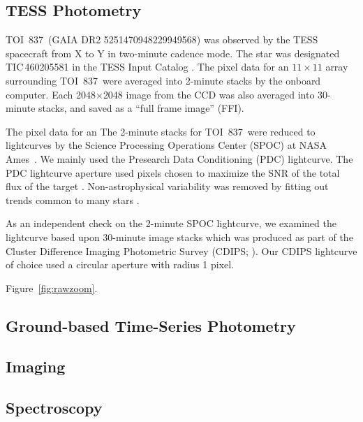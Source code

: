 \documentclass[12pt,twocolumn,tighten]{aastex62}
\newcommand{\tn}{TOI~837} %
\begin{document}
\subsection{TESS Photometry}
\label{subsec:tess}

\tn\ (GAIA DR2 5251470948229949568) was observed by the
TESS spacecraft from X to Y in two-minute cadence mode.
The star was designated
TIC\,460205581 in the TESS Input Catalog
\citep{stassun_TIC_2018,stassun_TIC8_2019}.
The pixel data for an
$11\times11$ array surrounding \tn\ were averaged into 2-minute
stacks by the onboard computer.  Each 2048$\times$2048 image from the
CCD was also averaged into 30-minute stacks, and saved as a ``full
frame image'' (FFI).

The pixel data for an
The 2-minute stacks for \tn\ were reduced to lightcurves by the
Science Processing Operations Center (SPOC) at NASA
Ames~\citep{jenkins_tess_2016}.  We mainly used the Presearch Data
Conditioning (PDC) lightcurve.  The PDC lightcurve aperture used
pixels chosen to maximize the SNR of the total flux of the target
\citep{smith_finding_2016}.  Non-astrophysical variability
was removed by fitting out trends common to many stars
\citep{smith_kepler_2012,stumpe_multiscale_2014}.

As an independent check on the 2-minute SPOC lightcurve, we examined
the lightcurve based upon 30-minute image stacks which was produced as
part of the Cluster Difference Imaging Photometric Survey (CDIPS;
\citealt{bouma_cluster_2019}).  Our CDIPS lightcurve of choice used a
circular aperture with radius 1 pixel.



Figure~\ref{fig:rawzoom}.

\subsection{Ground-based Time-Series Photometry}

\subsection{Imaging}

\subsection{Spectroscopy}
\end{document}
